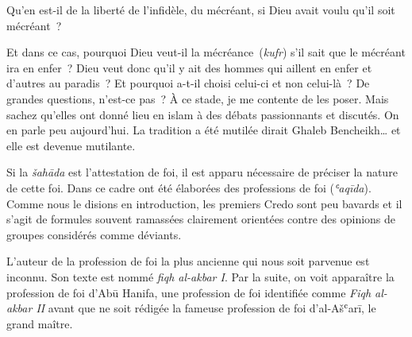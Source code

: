 Qu'en est-il de la liberté de l'infidèle, du mécréant, si Dieu avait
voulu qu'il soit mécréant~?

Et dans ce cas, pourquoi Dieu veut-il la mécréance~(\emph{kufr}) s'il
sait que le mécréant ira en enfer~? Dieu veut donc qu'il y ait des
hommes qui aillent en enfer et d'autres au paradis~? Et pourquoi a-t-il
choisi celui-ci et non celui-là~? De grandes questions, n'est-ce pas~? À
ce stade, je me contente de les poser. Mais sachez qu'elles ont donné
lieu en islam à des débats passionnants et discutés. On en parle peu
aujourd'hui. La tradition a été mutilée dirait Ghaleb Bencheikh\ldots{}
et elle est devenue mutilante.








Si la \emph{šahāda} est l'attestation de foi, il est apparu nécessaire
de préciser la nature de cette foi. Dans ce cadre ont été élaborées des
professions de foi (\emph{ʿaqīda}). Comme nous le disions en
introduction, les premiers Credo sont peu bavards et il s'agit de
formules souvent ramassées clairement orientées contre des opinions de
groupes considérés comme déviants.

L'auteur de la profession de foi la plus ancienne qui nous soit parvenue
est inconnu. Son texte est nommé \emph{fiqh al-akbar I}. Par la suite,
on voit apparaître la profession de foi d'Abū Hanifa, une profession de
foi identifiée comme \emph{Fiqh al-akbar II} avant que ne soit rédigée
la fameuse profession de foi d'al-Ašʿarī, le grand maître.

